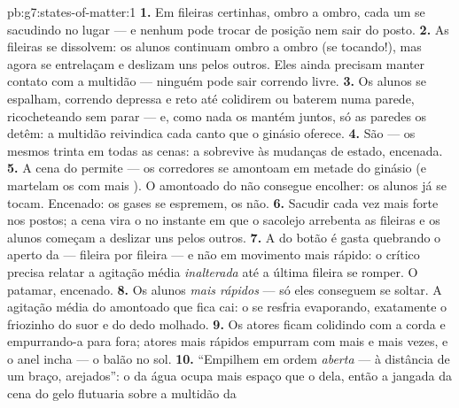 \begin{solution}{pb:g7:states-of-matter:1}
\textbf{1.} Em fileiras certinhas, ombro a ombro, cada um se
sacudindo no lugar --- e nenhum pode trocar de posição nem sair do
posto.
\textbf{2.} As fileiras se dissolvem: os alunos continuam ombro a
ombro (se tocando!), mas agora se entrelaçam e deslizam uns pelos
outros. Eles ainda precisam manter contato com a multidão --- ninguém
pode sair correndo livre.
\textbf{3.} Os alunos se espalham, correndo depressa e reto até
colidirem ou baterem numa parede, ricocheteando sem parar --- e, como
nada os mantém juntos, só as paredes os detêm: a multidão reivindica
cada canto que o ginásio oferece.
\textbf{4.} São --- os mesmos trinta em todas as cenas: a 
sobrevive às mudanças de estado, encenada.
\textbf{5.} A cena do  permite --- os corredores se amontoam em
metade do ginásio (e martelam os  com mais ). O
amontoado do  não consegue encolher: os alunos já se tocam.
Encenado: os gases se espremem, os  não.
\textbf{6.} Sacudir cada vez mais forte nos postos; a cena vira o
 no instante em que o sacolejo arrebenta as fileiras e os
alunos começam a deslizar uns pelos outros.
\textbf{7.} A  do botão é gasta quebrando o aperto da 
--- fileira por fileira --- e não em movimento mais rápido: o crítico
 precisa relatar a agitação média \emph{inalterada} até a
última fileira se romper. O patamar, encenado.
\textbf{8.} Os alunos \emph{mais rápidos} --- só eles conseguem se
soltar. A agitação média do amontoado que fica cai: o  se
resfria evaporando, exatamente o friozinho do suor e do dedo
molhado.
\textbf{9.} Os atores ficam colidindo com a corda e empurrando-a para
fora; atores mais rápidos empurram com mais  e mais vezes, e o
anel incha --- o balão no sol.
\textbf{10.} ``Empilhem em ordem \emph{aberta} --- à distância de um
braço, arejados'': o  da água ocupa mais espaço que o 
dela, então a jangada da cena do gelo flutuaria sobre a multidão da

\end{solution}
